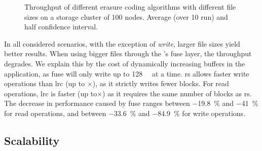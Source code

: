 \begin{figure*}[t]
    \centering
    
    \caption{Throughput of different erasure coding algorithms with different file sizes on a storage cluster of 100 nodes. Average (over 10 run) and half confidence interval.}
    \label{fig:throughput-plot}
\end{figure*}

In all considered scenarios, with the exception of \SYS \textit{write}, larger file sizes yield better results.
When using bigger files through the \SYS's \ac{fuse} layer, the throughput degrades.
We explain this by the cost of dynamically increasing buffers in the application, as \ac{fuse} will only write up to \SI{128}{\kibi\byte} at a time.
\ac{rs} allows faster write operations than \ac{lrc} (up to $\times$), as it strictly writes fewer blocks.
For read operations, \ac{lrc} is faster (up to$\times$) as it requires the same number of blocks as \ac{rs}.
The decrease in performance caused by \ac{fuse} ranges between \SI{-19.8}{\percent} and \SI{-41}{\percent} for read operations, and between \SI{-33.6}{\percent} and \SI{-84.9}{\percent} for write operations.


%

\subsection{Scalability}
\label{subsec:latency}

